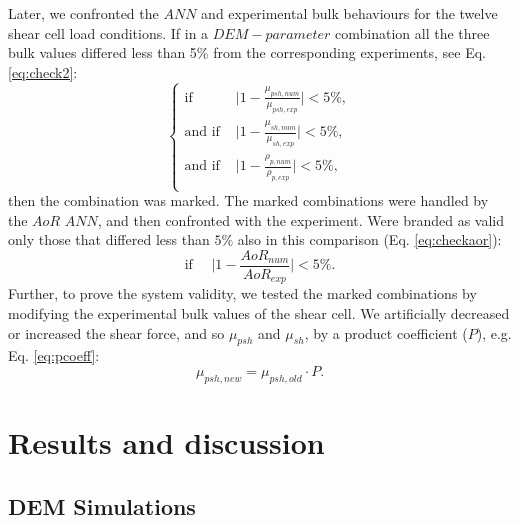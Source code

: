 \documentclass[review]{elsarticle}
\begin{document}
Later, we confronted the $ANN$ and experimental bulk behaviours for the twelve shear cell load conditions. 
If in a $DEM-parameter$ combination all the three bulk values differed less 
than 5\% from the corresponding experiments, see Eq. \ref{eq:check2}:
\begin{equation}
 \begin{cases}
\text{if } & \lvert{1-\frac{\mu_{psh,num}}{\mu_{psh,exp}}}\rvert < 5\%  ,\\
\text{and if } & \lvert{1-\frac{\mu_{sh,num}}{\mu_{sh,exp}}}\rvert < 5\% , \\ 
\text{and if } & \lvert{1-\frac{\rho_{p,num}}{\rho_{p,exp}}}\rvert < 5\% ,\\ 
\end{cases}
 \label{eq:check2}
\end{equation}
then the combination was marked. The marked combinations were handled by the
$AoR$ $ANN$, and then confronted with the experiment.
Were branded as valid only those that differed less than $5\%$ also in this
comparison (Eq. \ref{eq:checkaor}):
\begin{equation}
\text{if} ~~~~~~ \lvert{1-\frac{AoR_{num}}{AoR_{exp}}}\rvert < 5\% .
\label{eq:checkaor}
\end{equation}
Further, to prove the system validity, we tested the marked combinations by
modifying the experimental bulk values of the shear cell. 
We artificially decreased or increased the shear force, and so $\mu_{psh}$ and
$\mu_{sh}$, by a product coefficient ($P$), e.g. Eq. \ref{eq:pcoeff}:
\begin{equation}
\label{eq:pcoeff}
\mu_{psh, new} = \mu_{psh, old} \cdot P .
\end{equation}

\section{Results and discussion}
\label{sec:results}

\subsection{DEM Simulations}
\label{subsec:simulations}
\end{document}
